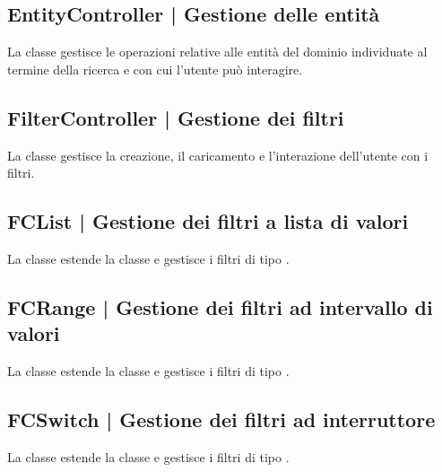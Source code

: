 \documentclass[10pt,a4paper,headinclude,footinclude,hidelinks]{scrreprt} %
\begin{document}
	\subsection[EntityController]{EntityController | Gestione delle entità}
	\label{sec:stage:design:controller:entity}
	La classe \textit{} gestisce le operazioni relative alle entità del dominio individuate al termine della ricerca e con cui l'utente può interagire.

	\subsection[FilterController]{FilterController | Gestione dei filtri}
	\label{sec:stage:design:controller:filter}
	La classe \textit{} gestisce la creazione, il caricamento e l'interazione dell'utente con i filtri.

	\subsection[FCList]{FCList | Gestione dei filtri a lista di valori}
	\label{sec:stage:design:controller:filter-list}
	La classe \textit{} estende la classe \textit{} e gestisce i filtri di tipo \textit{}.

	\subsection[FCRange]{FCRange | Gestione dei filtri ad intervallo di valori}
	\label{sec:stage:design:controller:filter-range}
	La classe \textit{} estende la classe \textit{} e gestisce i filtri di tipo \textit{}.

	\subsection[FCSwitch]{FCSwitch | Gestione dei filtri ad interruttore}
	\label{sec:stage:design:controller:filter-switch}
	La classe \textit{} estende la classe \textit{} e gestisce i filtri di tipo \textit{}.
\end{document}
